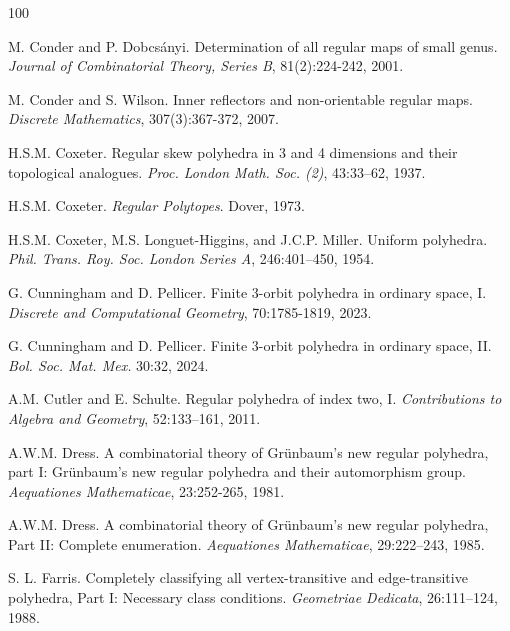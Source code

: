 \documentclass[12pt]{article}
\theoremstyle{definition}\newtheorem{definition}{Definition}[section]
\begin{document}
\begin{thebibliography}{100}

    M. Conder and P. Dobcsányi. Determination of all regular maps of small genus. \textit{Journal of Combinatorial Theory, Series B}, 81(2):224-242, 2001.

    M. Conder and S. Wilson. Inner reflectors and non-orientable regular maps. \textit{Discrete Mathematics}, 307(3):367-372, 2007.
    
    H.S.M. Coxeter. Regular skew polyhedra in 3 and 4 dimensions and their topological analogues. \textit{Proc. London Math. Soc. (2)}, 43:33–62, 1937.


    H.S.M. Coxeter. \textit{Regular Polytopes}. Dover, 1973. 

    H.S.M. Coxeter, M.S. Longuet-Higgins, and J.C.P. Miller. Uniform polyhedra. \textit{Phil. Trans. Roy. Soc. London Series A}, 246:401–450, 1954.


    G. Cunningham and D. Pellicer. Finite 3-orbit polyhedra in ordinary space, I. \textit{Discrete and Computational Geometry}, 70:1785-1819, 2023.

    G. Cunningham and D. Pellicer. Finite 3-orbit polyhedra in ordinary space, II. \textit{Bol. Soc. Mat. Mex.} 30:32, 2024.

    A.M. Cutler and E. Schulte. Regular polyhedra of index two, I. \textit{Contributions to Algebra and Geometry}, 52:133–161, 2011.

    A.W.M. Dress. A combinatorial theory of Grünbaum's new regular polyhedra, part I: Grünbaum's new regular polyhedra and their automorphism group. \textit{Aequationes Mathematicae}, 23:252-265, 1981. 

    A.W.M. Dress. A combinatorial theory of Grünbaum’s new regular polyhedra, Part II: Complete enumeration. \textit{Aequationes Mathematicae}, 29:222–243, 1985.

     S. L. Farris. Completely classifying all vertex-transitive and edge-transitive polyhedra, Part I: Necessary class conditions. \textit{Geometriae Dedicata}, 26:111–124, 1988.


\end{thebibliography}
\end{document}

